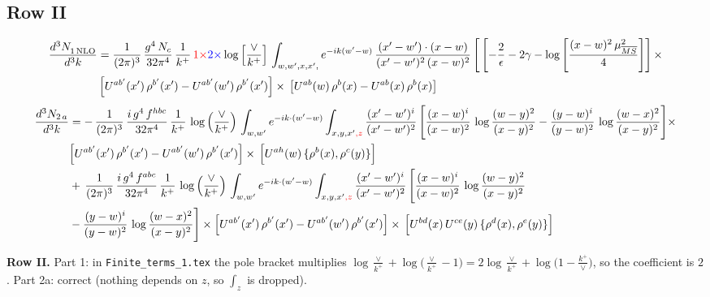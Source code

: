 \documentclass[9pt]{article}
\newcommand{\old}[1]{{\color{red}#1}}
\newcommand{\new}[1]{{\color{blue}#1}}
\numberwithin{equation}{section}
\begin{document}
\subsection{Row II}
\begin{align}
     \frac{d^{3}N_{1\,\rm NLO}^{\rm}}{d^{3}k} &  = \frac{1}{(2\pi)^{3}}\, \frac{g^{4}\,N_{c}}{32\pi^{4}}\,\frac{1}{k^{+}}\,\old{1\times}\new{2\times}\log{\left[\frac{\vee}{k^{+}}\right]}\, \int_{w, w',x,x',} e^{-ik(w^\prime-w)}\, \frac{(x'-w')\cdot (x-w)}{(x'-w')^{2}\, (x-w)^{2}}\, \Bigg[\left[-\frac{2}{\epsilon}-2\gamma-\log{\left[\frac{(x-w)^{2}\,\mu^{2}_{\overline{MS}}}{4}\right]}\right]\times\notag \\ &  \left[U^{ab'}(x')\,\rho^{b'}(x') - U^{ab'}(w')\,\rho^{b'}(x')\right]\times\,\left[U^{ab}(w)\,\rho^{b}(x) - U^{ab}(x)\,\rho^{b}(x)\right]
\end{align}
\begin{align}
    \frac{d^{3}N_{2\,a}}{d^{3}k} & =  -\,\frac{1}{(2\pi)^{3}}\,\frac{i\,g^{4}\,f^{hbc}}{32\pi^{4}}\,\frac{1}{k^{+}}\,\log\left(\frac{\vee}{k^{+}}\right)\,
\int_{w,w'} e^{-ik\cdot(w'-w)}\int_{x,y,x'\old{,z}}\frac{(x'-w')^{i}}{(x'-w')^{2}}\,\Bigg[\frac{(x-w)^{i}}{(x-w)^{2}}\,\log\frac{(w-y)^{2}}{(x-y)^{2}}-\frac{(y-w)^{i}}{(y-w)^{2}}\,\log\frac{(w-x)^{2}}{(x-y)^{2}}\Bigg]\times\notag \\ & \Big[U^{ab'}(x')\,\rho^{b'}(x')-U^{ab'}(w')\,\rho^{b'}(x')\Big]\times\, \Big[U^{ah}(w)\,\{\rho^{b}(x),\rho^{c}(y)\}\Big]\notag \\ & +\,\frac{1}{(2\pi)^{3}}\,\frac{i\,g^{4}\,f^{abc}}{32\pi^{4}}\,\frac{1}{k^{+}}\, \log\left(\frac{\vee}{k^{+}}\right)\,
\int_{w,w'} e^{-ik\cdot(w'-w)}\int_{x,y,x'\old{,z}}\frac{(x'-w')^{i}}{(x'-w')^{2}}\,\Bigg[\frac{(x-w)^{i}}{(x-w)^{2}}\,\log\frac{(w-y)^{2}}{(x-y)^{2}}\notag \\ & -\frac{(y-w)^{i}}{(y-w)^{2}}\,\log\frac{(w-x)^{2}}{(x-y)^{2}}\Bigg]\times \Big[U^{ab'}(x')\,\rho^{b'}(x')-U^{ab'}(w')\,\rho^{b'}(x')\Big]\times\, \Big[U^{bd}(x)\,U^{ce}(y)\,\{\rho^{d}(x),\rho^{e}(y)\}\Big]
\end{align}

\new{\textbf{Row II.} Part 1: in \texttt{Finite\_terms\_1.tex} the pole bracket multiplies $\log\frac{\vee}{k^+}+\log\big(\frac{\vee}{k^+}-1\big)=2\log\frac{\vee}{k^+}+\log\big(1-\frac{k^+}{\vee}\big)$, so the coefficient is $2$. Part 2a: correct (nothing depends on $z$, so $\int_z$ is dropped).}
\end{document}
